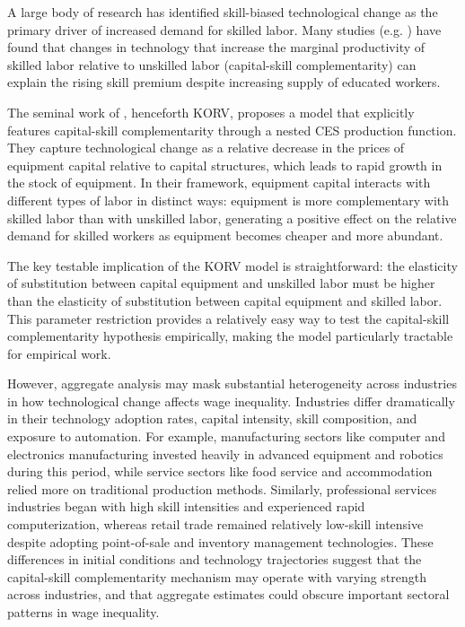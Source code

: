 \documentclass[12pt]{article}
\begin{document}
A large body of research has identified skill-biased technological change as the primary driver of increased demand for skilled labor. Many studies (e.g. \citet{katz1992changes, krusell2000capital,card2002skill, acemoglu2002directed}) have found that changes in technology that increase the marginal productivity of skilled labor relative to unskilled labor (capital-skill complementarity) can explain the rising skill premium despite increasing supply of educated workers.

The seminal work of \citet{krusell2000capital}, henceforth KORV, proposes a model that explicitly features capital-skill complementarity through a nested CES production function. They capture technological change as a relative decrease in the prices of equipment capital relative to capital structures, which leads to rapid growth in the stock of equipment. In their framework, equipment capital interacts with different types of labor in distinct ways: equipment is more complementary with skilled labor than with unskilled labor, generating a positive effect on the relative demand for skilled workers as equipment becomes cheaper and more abundant.

The key testable implication of the KORV model is straightforward: the elasticity of substitution between capital equipment and unskilled labor must be higher than the elasticity of substitution between capital equipment and skilled labor. This parameter restriction provides a relatively easy way to test the capital-skill complementarity hypothesis empirically, making the model particularly tractable for empirical work.

However, aggregate analysis may mask substantial heterogeneity across industries in how technological change affects wage inequality. Industries differ dramatically in their technology adoption rates, capital intensity, skill composition, and exposure to automation. For example, manufacturing sectors like computer and electronics manufacturing invested heavily in advanced equipment and robotics during this period, while service sectors like food service and accommodation relied more on traditional production methods. Similarly, professional services industries began with high skill intensities and experienced rapid computerization, whereas retail trade remained relatively low-skill intensive despite adopting point-of-sale and inventory management technologies. These differences in initial conditions and technology trajectories suggest that the capital-skill complementarity mechanism may operate with varying strength across industries, and that aggregate estimates could obscure important sectoral patterns in wage inequality.
\end{document}
